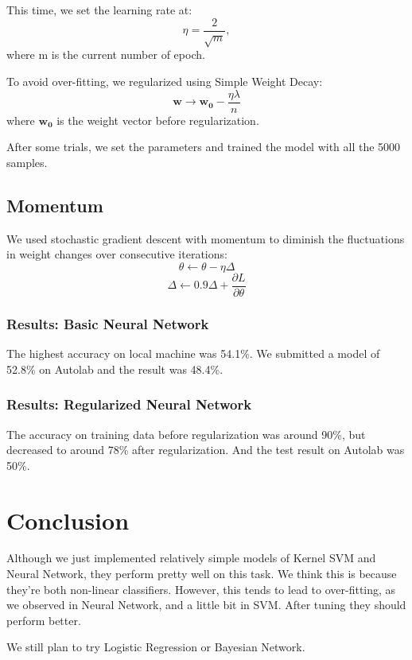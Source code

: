 \documentclass{article} %
\begin{document}
This time, we set the learning rate at:
\begin{equation}
\eta = \frac{2}{\sqrt{m}},
\end{equation}
where m is the current number of epoch. 

To avoid over-fitting, we regularized using Simple Weight Decay:
\begin{equation}
\mathbf{w}\rightarrow\mathbf{w_0}-\frac{\eta\lambda}{n}
\end{equation}
where $\mathbf{w_0}$ is the weight vector before regularization.

After some trials, we set the parameters and trained the model with all the 5000 samples.
\subsection{Momentum}
We used stochastic gradient descent with momentum to diminish the fluctuations in weight changes over consecutive iterations:
\begin{equation}
\theta \leftarrow \theta - \eta \Delta
\end{equation}
\begin{equation}
\Delta \leftarrow 0.9 \Delta + \frac{\partial L}{\partial \theta}
\end{equation}
\subsubsection{Results: Basic Neural Network}
The highest accuracy on local machine was 54.1\%. We submitted a model of 52.8\% on Autolab and the result was 48.4\%.
\subsubsection{Results: Regularized Neural Network}
The accuracy on training data before regularization was around 90\%, but decreased to around 78\% after regularization. And the test result on Autolab was 50\%.



\section{Conclusion}
Although we just implemented relatively simple models of Kernel SVM and Neural Network, they perform pretty well on this task. We think this is because they're both non-linear classifiers. However, this tends to lead to over-fitting, as we observed in Neural Network, and a little bit in SVM. After tuning they should perform better.

We still plan to try Logistic Regression or Bayesian Network.




\end{document}
